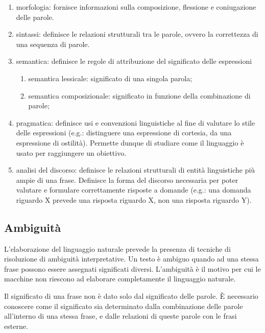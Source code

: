 \begin{enumerate}

	\item morfologia: fornisce informazioni sulla composizione, flessione e coniugazione delle parole.
	
	\item sintassi: definisce le relazioni strutturali tra le parole, ovvero la correttezza di una sequenza di parole.
	
	\item semantica: definisce le regole di attribuzione del significato delle espressioni
	
	\begin{enumerate}
		
		\item semantica lessicale: significato di una singola parola;
		
		\item semantica composizionale: significato in funzione della combinazione di parole;
		
	\end{enumerate}
	
	\item pragmatica: definisce usi e convenzioni linguistiche al fine di valutare lo stile delle espressioni (e.g.: distinguere una espressione di cortesia, da una espressione di ostilità). Permette dunque di studiare come il linguaggio è usato per raggiungere un obiettivo.
	
	\item analisi del discorso: definisce le relazioni strutturali di entità linguistiche più ampie di una frase. Definisce la forma del discorso necessaria per poter valutare e formulare correttamente risposte a domande (e.g.: una domanda riguardo X prevede una risposta riguardo X, non una risposta riguardo Y).
	
\end{enumerate}

\subsection{Ambiguità}
L'elaborazione del linguaggio naturale prevede la presenza di tecniche di risoluzione di ambiguità interpretative. Un testo è ambiguo quando ad una stessa frase possono essere assegnati significati diversi. L’ambiguità è il motivo per cui le macchine non riescono ad elaborare completamente il linguaggio naturale.

Il significato di una frase non è dato solo dal significato delle parole. È necessario conoscere come il significato sia determinato dalla combinazione delle parole all'interno di una stessa frase, e dalle relazioni di queste parole con le frasi esterne.

